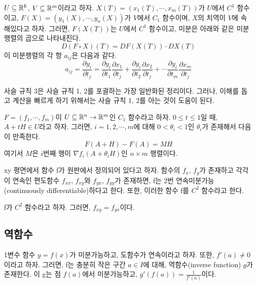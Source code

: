\begin{theorem}
$U \subseteq \mathbb{R}^k$, $V \subseteq \mathbb{R}^m$이라고 하자. $X(T)=(x_1(T),\cdots,x_m(T))$가 $U$에서 $C^1$ 함수이고, $F(X)=(y_1(X),\cdots,y_n(X))$가 $V$에서 $C_1$ 함수이며, $X$의 치역이 $V$에 속해있다고 하자. 그러면, $F(X(T))$는 $U$에서 $C^1$ 함수이고, 미분은 아래와 같은 미분행렬의 곱으로 나타내진다.
$$
D(F\circ X)(T) = DF(X(T))\cdot DX(T)
$$
이 미분행렬의 각 항 $a_{ij}$은 다음과 같다.
$$
a_{ij} = \frac{\partial y_i}{\partial t_j} = \frac{\partial y_i}{\partial t_1}\frac{\partial x_1}{\partial t_j} + \frac{\partial y_i}{\partial t_2}\frac{\partial x_2}{\partial t_j} + \cdots \frac{\partial y_i}{\partial t_m}\frac{\partial x_m}{\partial t_j}
$$
\end{theorem}

사슬 규칙 3은 사슬 규칙 1, 2를 포괄하는 가장 일반화된 정리이다. 그러나, 이해를 돕고 계산을 빠르게 하기 위해서는 사슬 규칙 1, 2를 아는 것이 도움이 된다.

\begin{theorem}
$F=(f_1,\cdots,f_m)$이 $U \subseteq \mathbb{R}^n \to \mathbb{R}^m$인 $C_1$ 함수라고 하자. $0 \leq t \leq 1$일 때, $A+tH \in U$라고 하자. 그러면, $i=1,2,\cdots,m$에 대해 $0 < \theta_i < 1$인 $\theta_i$가 존재해서 다음이 만족한다.
$$
F(A+H)-F(A)=MH
$$
여기서 $M$은 $i$번째 행이 $\nabla f_i (A+\theta_i H)$인 $n \times m$ 행렬이다.
\end{theorem}

\begin{definition}[2번 연속미분]
xy 평면에서 함수 f가 원판에서 정의되어 있다고 하자. 함수의 $f_x$, $f_y$가 존재하고 각각이 연속인 편도함수 $f_{xx}$, $f_{xy}$와 $f_{yx}$, $f_{yy}$가 존재하면, f는 2번 연속미분가능(continuously differentiable)하다고 한다. 또한, 이러한 함수 f를 $C^2$ 함수라고 한다.
\end{definition}

\begin{theorem}
f가 $C^2$ 함수라고 하자. 그러면, $f_{xy}=f_{yx}$이다.
\end{theorem}

\subsection{역함수}
1변수 함수 $y=f(x)$가 미분가능하고, 도함수가 연속이라고 하자. 또한, $f'(a) \neq 0$이라고 하자. 그러면, f는 충분히 작은 구간 $a \in I$에 대해, 역함수(inverse function) $g$가 존재한다. 이 g는 점 $f(a)$에서 미분가능하고, $g ' (f(a))= \frac{1}{f'(a)}$이다.

